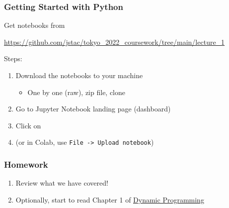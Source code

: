 \begin{frame}
    \frametitle{Getting Started with Python}

    Get notebooks from 

    \begin{center}
        \url{https://github.com/jstac/tokyo_2022_coursework/tree/main/lecture_1}
    \end{center}


    Steps:
    \begin{enumerate}
        \item Download the notebooks to your machine 
            \vspace{0.5em}
            \begin{itemize}
                \item One by one (raw), zip file, clone
            \end{itemize}
            \vspace{0.5em}
        \item Go to Jupyter Notebook landing page (dashboard)
            \vspace{0.5em}
        \item Click on 
            \vspace{0.5em}
        \item (or in Colab, use \texttt{File -> Upload notebook})
    \end{enumerate}

\end{frame}


\begin{frame}
    \frametitle{Homework}

    \begin{enumerate}
        \item Review what we have covered!
            \vspace{0.5em}
        \item Optionally, start to read Chapter 1 of \underline{Dynamic Programming}
    \end{enumerate}

\end{frame}





